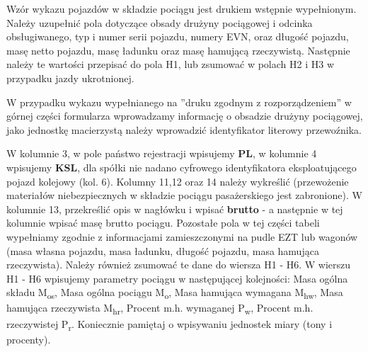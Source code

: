 Wzór wykazu pojazdów w składzie pociągu jest drukiem wstępnie wypełnionym. Należy uzupełnić pola dotyczące obsady drużyny pociągowej i odcinka obsługiwanego, typ i numer serii pojazdu, numery EVN, oraz długość pojazdu, masę netto pojazdu, masę ładunku oraz masę hamującą rzeczywistą. Następnie należy te wartości przepisać do pola H1, lub zsumować w polach H2 i H3 w przypadku jazdy ukrotnionej.

W przypadku wykazu wypełnianego na ''druku zgodnym z rozporządzeniem'' w górnej części formularza wprowadzamy informację o obsadzie drużyny pociągowej, jako jednostkę macierzystą należy wprowadzić identyfikator literowy przewoźnika.

W kolumnie 3, w pole państwo rejestracji wpisujemy \textbf{PL}, w kolumnie 4 wpisujemy \textbf{KSL}, dla spółki nie nadano cyfrowego identyfikatora eksploatującego pojazd kolejowy (kol. 6). Kolumny 11,12 oraz 14 należy wykreślić (przewożenie materiałów niebezpiecznych w składzie pociągu pasażerskiego jest zabronione). W kolumnie 13, przekreślić opis w nagłówku i wpisać \textbf{brutto} - a następnie w tej kolumnie wpisać masę brutto pociągu. Pozostałe pola w tej części tabeli wypełniamy zgodnie z informacjami zamieszczonymi na pudle EZT lub wagonów (masa własna pojazdu, masa ładunku, długość pojazdu, masa hamująca rzeczywista). Należy również zsumować te dane do wiersza H1 - H6.
W wierszu H1 - H6 wpisujemy parametry pociągu w następującej kolejności: Masa ogólna składu M\textsubscript{os}, Masa ogólna pociągu M\textsubscript{o}, Masa hamująca wymagana M\textsubscript{hw}, Masa hamująca rzeczywista M\textsubscript{hr}, Procent m.h. wymaganej P\textsubscript{w}, Procent m.h. rzeczywistej P\textsubscript{r}. Koniecznie pamiętaj o wpisywaniu jednostek miary (tony i procenty).


